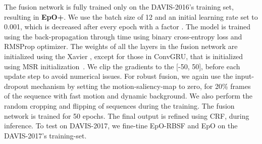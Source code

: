 \documentclass[10pt,twocolumn,letterpaper]{article}
\begin{document}
The fusion network is fully trained only on the DAVIS-2016's training set, resulting in \textbf{EpO+}.
We use the batch size of 12 and an initial learning rate set to 0.001, which is decreased after every epoch with a factor . 
The model is trained using the back-propagation through time \cite{backpropagationThrougTime} using binary cross-entropy loss and RMSProp optimizer. 
The weights of all the layers in the fusion network are initialized using the Xavier \cite{xavier}, except for those in ConvGRU, that is initialized using MSR initialization~\cite{MSR}. We clip the gradients to the [-50, 50], before each update step \cite{graves2013generating} to avoid numerical issues. 
For robust fusion, we again use the input-dropout mechanism by setting the motion-saliency-map to zero, for 20\% frames of the sequence with fast motion and dynamic background. We also perform the random cropping and flipping of sequences during the training. The fusion network is trained for 50 epochs. The final output is refined using CRF, during inference. 
To test on DAVIS-2017, we fine-tine EpO-RBSF and EpO on the DAVIS-2017's training-set.

\vspace{0.125cm}
\end{document}
